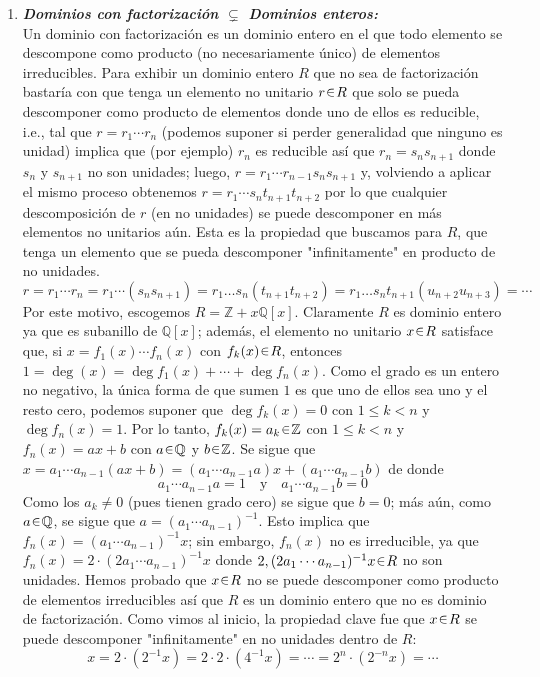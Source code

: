 \begin{sol}\hphantom{r}
\begin{enumerate}[label={\bfseries\Roman*}., wide, itemsep=1em]

\item{}
\emph{\bfseries Dominios con factorización $\subsetneq$ Dominios enteros:}\\
Un dominio con factorización es un dominio entero en el que todo elemento se descompone como producto (no necesariamente único) de elementos irreducibles. Para exhibir un dominio entero $R$ que no sea de factorización bastaría con que tenga un elemento no unitario $r \en R$ que solo se pueda descomponer como producto de elementos donde uno de ellos es reducible, i.e., tal que $r = r_1 \cdots r_n$ (podemos suponer si perder generalidad que ninguno es unidad) implica que (por ejemplo) $r_n$ es reducible así que $r_n = s_ns_{n+1}$ donde $s_n$ y $s_{n+1}$ no son unidades; luego, $r = r_1 \cdots r_{n-1}s_ns_{n+1}$ y, volviendo a aplicar el mismo proceso obtenemos $r = r_1 \cdots s_{n}t_{n+1}t_{n+2}$ por lo que cualquier descomposición de $r$ (en no unidades) se puede descomponer en más elementos no unitarios aún. Esta es la propiedad que buscamos para $R$, que tenga un elemento que se pueda descomponer "infinitamente" en producto de no unidades.
\[
r = r_1\cdots r_n = r_1 \cdots (s_ns_{n+1}) = r_1\dots s_n(t_{n+1} t_{n+2}) = r_1\dots s_nt_{n+1}(u_{n+2}u_{n+3}) = \cdots
\]
Por este motivo, escogemos $R = \mathbb{Z} + x\mathbb{Q}[x]$. Claramente $R$ es dominio entero ya que es subanillo de $\mathbb{Q}[x]$; además, el elemento no unitario $x \en R$ satisface que, si $x = f_1(x) \cdots f_n(x)$ con $f_k(x) \en R$, entonces $1 = \deg(x) = \deg f_1(x) + \cdots + \deg f_n(x)$. Como el grado es un entero no negativo, la única forma de que sumen $1$ es que uno de ellos sea uno y el resto cero, podemos suponer que $\deg f_k(x) = 0$ con $1\leq k < n$ y $\deg f_n(x) = 1$. Por lo tanto, $f_k(x) = a_k \en \mathbb{Z}$ con $1 \leq k < n$ y $f_n(x) = ax + b$ con $a \en \mathbb{Q}$ y $b \en \mathbb{Z}$. Se sigue que $x = a_1 \cdots a_{n-1}(ax + b) = (a_1 \cdots a_{n-1}a)x + (a_1 \cdots a_{n-1}b)$ de donde
\[
a_1 \cdots a_{n-1}a = 1%
\quad\text{y}\quad%
a_1 \cdots a_{n-1}b = 0%
\]
Como los $a_k \neq 0$ (pues tienen grado cero) se sigue que $b = 0$; más aún, como $a \en \mathbb{Q}$, se sigue que $a = (a_1\cdots a_{n-1})^{-1}$. Esto implica que $f_n(x) = (a_1\cdots a_{n-1})^{-1}x$; sin embargo, $f_n(x)$ no es irreducible, ya que $f_n(x) = 2 \cdot (2a_1\cdots a_{n-1})^{-1}x$ donde $2, (2a_1\cdots a_{n-1})^{-1}x\en R$ no son unidades. Hemos probado que $x \en R$ no se puede descomponer como producto de elementos irreducibles así que $R$ es un dominio entero que no es dominio de factorización. Como vimos al inicio, la propiedad clave fue que $x \en R$ se puede descomponer "infinitamente" en no unidades dentro de $R$:
\[
x = 2 \cdot (2^{-1}x) = 2 \cdot 2 \cdot (4^{-1}x) = \cdots= 2^n \cdot (2^{-n}x) = \cdots
\]


\end{enumerate}
\end{sol}
